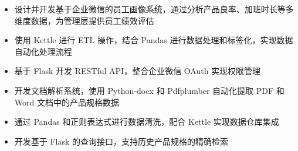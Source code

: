 \documentclass{resume}
\begin{document}
\begin{onehalfspacing}
\begin{itemize}
\item 设计并开发基于企业微信的员工画像系统，通过分析产品良率、加班时长等多维度数据，为管理层提供员工绩效评估
\item 使用 Kettle 进行 ETL 操作，结合 Pandas 进行数据处理和标签化，实现数据自动化处理流程
\item 基于 Flask 开发 RESTful API，整合企业微信 OAuth 实现权限管理
\end{itemize}
\end{onehalfspacing}

\begin{onehalfspacing}
\begin{itemize}
\item 开发文档解析系统，使用 Python-docx 和 Pdfplumber 自动化提取 PDF 和 Word 文档中的产品规格数据
\item 通过 Pandas 和正则表达式进行数据清洗，配合 Kettle 实现数据仓库集成
\item 开发基于 Flask 的查询接口，支持历史产品规格的精确检索
\end{itemize}
\end{onehalfspacing}




\end{document}
